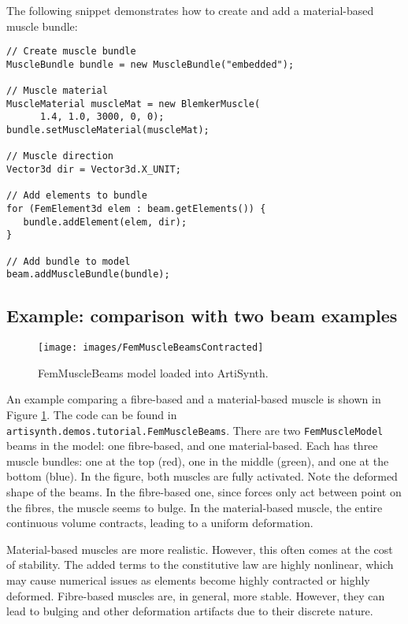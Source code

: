 The following snippet demonstrates how to create and add a material-based
muscle bundle:
\lstset{numbers=left}
\begin{lstlisting}[]
// Create muscle bundle
MuscleBundle bundle = new MuscleBundle("embedded");

// Muscle material
MuscleMaterial muscleMat = new BlemkerMuscle(
      1.4, 1.0, 3000, 0, 0);
bundle.setMuscleMaterial(muscleMat); 

// Muscle direction
Vector3d dir = Vector3d.X_UNIT;

// Add elements to bundle
for (FemElement3d elem : beam.getElements()) {
   bundle.addElement(elem, dir);
}

// Add bundle to model      
beam.addMuscleBundle(bundle);
\end{lstlisting}
\lstset{numbers=none}

\subsection{Example: comparison with two beam examples}

\begin{figure}[ht]
	\centering
	\texttt{[image: images/FemMuscleBeamsContracted]}
	\caption{FemMuscleBeams model loaded into ArtiSynth.}
	\label{fig:fem:musclebeams}
\end{figure}

An example comparing a fibre-based and a material-based muscle is shown 
in Figure \ref{fig:fem:musclebeams}.  The code can be found in 
{\tt artisynth.demos.tutorial.FemMuscleBeams}.  There are two 
{\tt FemMuscleModel} beams in the model: one fibre-based, and one 
material-based.  Each has three muscle bundles: one at the top (red),
one in the middle (green), and one at the bottom (blue).  In the figure,
both muscles are fully activated.  Note the deformed shape of the beams.
In the fibre-based one, since forces only act between point on the fibres,
the muscle seems to bulge.  In the material-based muscle, the entire
continuous volume contracts, leading to a uniform deformation.  

Material-based muscles are more realistic.  However, this often comes at the cost
of stability.  The added terms to the constitutive law are highly nonlinear,
which may cause numerical issues as elements become highly contracted or
highly deformed.  Fibre-based muscles are, in general, more stable.  However,
they can lead to bulging and other deformation artifacts due to their discrete
nature.

